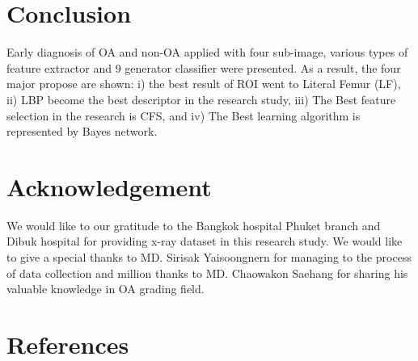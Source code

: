 \documentclass[review]{elsarticle}
\begin{document}
\section{Conclusion}
Early diagnosis of OA and non-OA applied with four sub-image, various types of feature extractor and 9 generator classifier were presented. As a result, the four major propose are shown: i) the best result of ROI went to Literal Femur (LF), ii) LBP become the best descriptor in the research study, iii) The Best feature selection in the research is CFS, and iv) The Best learning algorithm  is represented by Bayes network. 
\section{Acknowledgement}
We would like to our gratitude to the Bangkok hospital Phuket branch and Dibuk hospital for providing x-ray dataset in this research study. We would like to give a special thanks to MD. Sirisak Yaisoongnern for managing to the process of data collection and million thanks to MD. Chaowakon Saehang for sharing his valuable knowledge in OA grading field. 

\section*{References}


\end{document}
